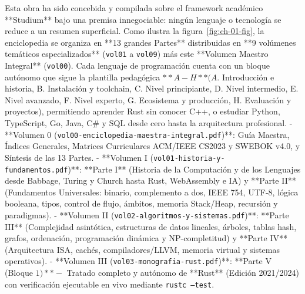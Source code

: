 \documentclass{book}
\begin{document}
Esta obra ha sido concebida y compilada sobre el framework académico **Studium** bajo una premisa innegociable: ningún lenguaje o tecnología se reduce a un resumen superficial. Como ilustra la figura~\ref{fig:ch-01-fig}, la enciclopedia se organiza en **13 grandes Partes** distribuidas en **9 volúmenes temáticos especializados** (\texttt{vol01} a \texttt{vol09}) más este **Volumen Maestro Integral** (\texttt{vol00}). Cada lenguaje de programación cuenta con un bloque autónomo que sigue la plantilla pedagógica \(**A-H** (A\). Introducción e historia, B. Instalación y toolchain, C. Nivel principiante, D. Nivel intermedio, E. Nivel avanzado, F. Nivel experto, G. Ecosistema y producción, H. Evaluación y proyectos), permitiendo aprender Rust sin conocer C++, o estudiar Python, TypeScript, Go, Java, C\# y SQL desde cero hasta la arquitectura profesional.
- **Volumen 0 (\texttt{vol00-enciclopedia-maestra-integral.pdf})**: Guía Maestra, Índices Generales, Matrices Curriculares ACM/IEEE CS2023 y SWEBOK v4.0, y Síntesis de las 13 Partes.
- **Volumen I (\texttt{vol01-historia-y-fundamentos.pdf})**: **Parte I** (Historia de la Computación y de los Lenguajes desde Babbage, Turing y Church hasta Rust, WebAssembly e IA) y **Parte II** (Fundamentos Universales: binario, complemento a dos, IEEE 754, UTF-8, lógica booleana, tipos, control de flujo, ámbitos, memoria Stack/Heap, recursión y paradigmas).
- **Volumen II (\texttt{vol02-algoritmos-y-sistemas.pdf})**: **Parte III** (Complejidad asintótica, estructuras de datos lineales, árboles, tablas hash, grafos, ordenación, programación dinámica y NP-completitud) y **Parte IV** (Arquitectura ISA, cachés, compiladores/LLVM, memoria virtual y sistemas operativos).
- **Volumen III (\texttt{vol03-monografia-rust.pdf})**: **Parte V (Bloque \(1)** -\) Tratado completo y autónomo de **Rust** (Edición 2021/2024) con verificación ejecutable en vivo mediante \texttt{rustc --test}.
\end{document}
